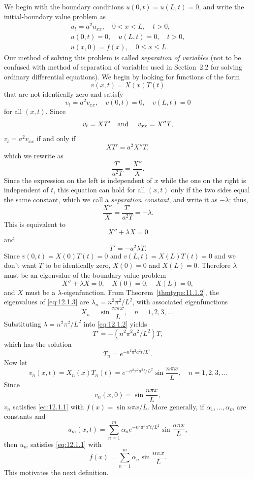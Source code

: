 We begin with the boundary conditions $u(0,t)=u(L,t)=0$, and write the initial-boundary value
problem as
\begin{equation}
  \label{eq:12.1.1}
  \begin{array}{c}
    u_{t}=a^{2}u_{xx},\quad0<x<L,\quad t>0, \\
    u(0,t)=0,\quad u(L,t)=0,\quad t>0,      \\
    u(x,0)=f(x),\quad0\le x\le L.
  \end{array}
\end{equation}
Our method of solving this problem is called {\color{blue}\it separation of variables\/} (not to be
confused with method of separation of variables used in Section~2.2 for solving ordinary
differential equations). We begin by looking for functions of the form
\[
  v(x,t)=X(x)T(t)
\]
that are not identically zero and satisfy
\[
  v_{t}=a^{2}v_{xx},\quad v(0,t)=0,\quad v(L,t)=0
\]
for all $(x,t)$. Since
\[
  v_{t}=XT'\mbox{\quad and \quad}v_{xx}=X''T,
\]
$v_{t}=a^{2}v_{xx}$ if and only if
\[
  XT'=a^{2}X''T,
\]
which we rewrite as
\[
  \frac{T'}{a^{2}T}=\frac{X''}{X}.
\]
Since the expression on the left is independent of $x$ while the one on the right is independent of
$t$, this equation can hold for all $(x,t)$ only if the two sides equal the same constant, which we
call a {\color{blue}\it separation constant\/}, and write it as $-\lambda$; thus,
\[
  \frac{X''}{X}=\frac{T'}{a^{2}T}=-\lambda.
\]
This is equivalent to
\[
  X''+\lambda X=0
\]
and
\begin{equation}
  \label{eq:12.1.2}T'=-a^{2}\lambda T.
\end{equation}
Since $v(0,t)=X(0)T(t)=0$ and $v(L,t)=X(L)T(t)=0$ and we don't want $T$ to be identically zero,
$X(0)=0$ and $X(L)=0$. Therefore $\lambda$ must be an eigenvalue of the boundary value problem
\begin{equation}
  \label{eq:12.1.3}X''+\lambda X=0,\quad X(0)=0,\quad X(L)=0,
\end{equation}
and $X$ must be a $\lambda$-eigenfunction. From Theorem~\ref{thmtype:11.1.2}, the eigenvalues of
\eqref{eq:12.1.3} are $\lambda_{n}=n^{2}\pi^{2}/L^{2}$, with associated eigenfunctions
\[
  X_{n}=\sin\frac{n\pi x}{L},\quad n=1,2,3,\dots.
\]
Substituting $\lambda=n^{2}\pi^{2}/L^{2}$ into \eqref{eq:12.1.2} yields
\[
  T'=-(n^{2}\pi^{2}a^{2}/L^{2})T,
\]
which has the solution
\[
  T_{n}=e^{-n^{2}\pi^{2}a^{2}t/L^{2}}.
\]
Now let
\[
  v_{n}(x,t)=X_{n}(x)T_{n}(t)=e^{-n^{2}\pi^{2}a^{2}t/L^{2}}\sin\frac{n\pi x}{L},\quad n=1,2,3,\dots
\]
Since
\[
  v_{n}(x,0)=\sin\frac{n\pi x}{L},
\]
$v_{n}$ satisfies \eqref{eq:12.1.1} with $f(x)=\sin n\pi x/L$. More generally, if
$\alpha_{1},\dots,\alpha_{m}$ are constants and
\[
  u_{m}(x,t)= \sum_{n=1}^{m}\alpha_{n}e^{-n^{2}\pi^{2}a^{2}t/L^{2}}\sin\frac{n\pi x}{L},
\]
then $u_{m}$ satisfies \eqref{eq:12.1.1} with
\[
  f(x)=\sum_{n=1}^{m}\alpha_{n}\sin\frac{n\pi x}{L}.
\]
This motivates the next definition.


